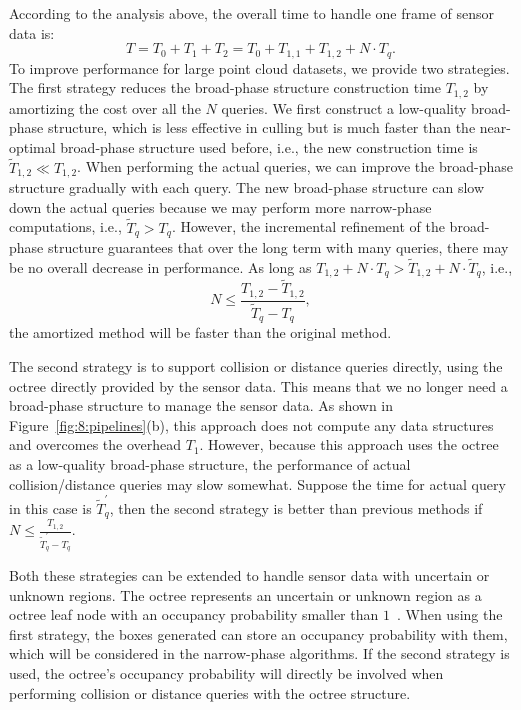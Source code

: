 According to the analysis above, the overall time to handle one
frame of sensor data is:
\begin{equation}
\label{eq:8:overalltime}
T = T_0 + T_1 + T_2 = T_0 + T_{1,1} + T_{1,2} + N \cdot T_q.
\end{equation}
To improve performance for large point cloud datasets, we provide two strategies. The first
strategy reduces the broad-phase structure construction time
$T_{1,2}$ by amortizing the cost over all the $N$ queries. We first
construct a low-quality broad-phase structure, which is less effective
in culling but is much faster than the near-optimal broad-phase
structure used before, i.e., the new construction time is
$\widetilde{T}_{1,2} \ll T_{1,2}$. When performing the actual queries,
we can improve the broad-phase structure gradually with each
query. The new broad-phase structure can slow down the actual queries
because we may perform more narrow-phase computations, i.e.,
$\widetilde{T}_q > T_q$. However, the incremental refinement of the broad-phase structure guarantees that over the long term with many queries, there may be no overall decrease in performance. As long as $T_{1,2} + N \cdot T_q > \widetilde{T}_{1,2} + N
\cdot \widetilde{T}_q$, i.e.,
\begin{equation}
\label{eq:8:Nstrategy1}
N \leq \frac{T_{1,2} - \widetilde{T}_{1,2}}{\widetilde{T}_q - T_q},
\end{equation}
the amortized method will be faster than the original method.

The second strategy is to support collision or distance queries
directly, using the octree directly provided by the sensor data. This means that we no longer need a broad-phase structure to manage the sensor data. As shown in Figure~\ref{fig:8:pipelines}(b), this approach does not compute any data structures and overcomes the overhead $T_1$. However, because this approach uses the octree as a low-quality
broad-phase structure, the performance of actual collision/distance queries may slow somewhat. Suppose the time for actual query in this case
is $\widetilde{T}_q^\prime$, then the second strategy is better than
previous methods if $N \leq \frac{T_{1,2}}{\widetilde{T}_q^\prime - T_q}$.

Both these strategies can be extended to handle sensor data with
uncertain or unknown regions. The octree represents an uncertain or
unknown region as a octree leaf node with an occupancy probability
smaller than $1$~\cite{octomap}. When using the first strategy, the
boxes generated can store an occupancy probability with them, which
will be considered in the narrow-phase algorithms. If the second
strategy is used, the octree's occupancy probability will directly be
involved when performing collision or distance queries with the
octree structure.


